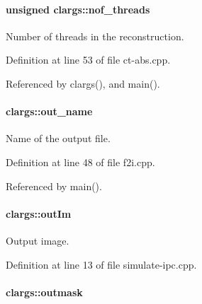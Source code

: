 \hypertarget{structclargs_a7221e87891bc3836d2e894bf522bc6f7}{
\paragraph[{nof\_\-threads}]{\setlength{\rightskip}{0pt plus 5cm}unsigned {\bf clargs::nof\_\-threads}}\hfill}
\label{structclargs_a7221e87891bc3836d2e894bf522bc6f7}


Number of threads in the reconstruction. 



Definition at line 53 of file ct-\/abs.cpp.



Referenced by clargs(), and main().

\hypertarget{structclargs_a6e3fc2c758fc6f5a376f67f5a17748da}{
\paragraph[{out\_\-name}]{ {\bf clargs::out\_\-name}}\hfill}
\label{structclargs_a6e3fc2c758fc6f5a376f67f5a17748da}


Name of the output file. 



Definition at line 48 of file f2i.cpp.



Referenced by main().

\hypertarget{structclargs_abe2f0cbfdf80f354fa43ba101ae37384}{
\paragraph[{outIm}]{ {\bf clargs::outIm}}\hfill}
\label{structclargs_abe2f0cbfdf80f354fa43ba101ae37384}


Output image. 



Definition at line 13 of file simulate-\/ipc.cpp.

\hypertarget{structclargs_acb0988630de3d6fcdda6d826e3e2bfab}{
\paragraph[{outmask}]{ {\bf clargs::outmask}}\hfill}
\label{structclargs_acb0988630de3d6fcdda6d826e3e2bfab}


